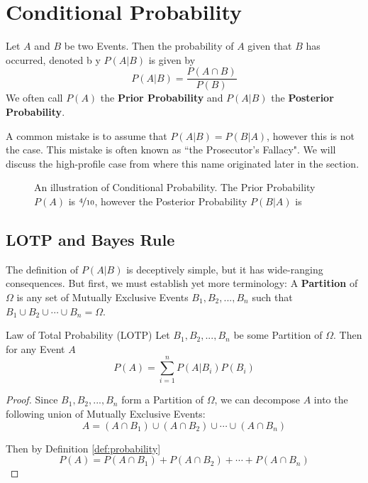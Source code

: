 \documentclass{report}
\begin{document}
\section{Conditional Probability}
Let $A$ and $B$ be two Events. Then the probability of $A$ given that $B$ has occurred, denoted b y $P(A\vert B)$ is given by
\[
    P(A\vert B)=\frac{P(A\cap B)}{P(B)}
\]
We often call $P(A)$ the \textbf{Prior Probability} and $P(A\vert B)$ the \textbf{Posterior Probability}.
\begin{notsofast}
    A common mistake is to assume that $P(A\vert B)=P(B\vert A)$, however this is not the case. This mistake is often known as ``the Prosecutor's Fallacy". We will discuss the high-profile case from where this name originated later in the section.
\end{notsofast}

\begin{figure}
    \centering
    
    \caption{An illustration of Conditional Probability. The Prior Probability $P(A)$ is $\nicefrac 4{10}$, however the Posterior Probability $P(B|A)$ is }
    \label{fig:dependence}
\end{figure}

\subsection{LOTP and Bayes Rule}
The definition of $P(A\vert B)$ is deceptively simple, but it has wide-ranging consequences. But first, we must establish yet more terminology: A \textbf{Partition} of $\Omega$ is any set of Mutually Exclusive Events $B_1,B_2,...,B_n$ such that $B_1\cup B_2\cup\cdots \cup B_n=\Omega$.

\begin{theorem}{Law of Total Probability (LOTP)}
Let $B_1,B_2,...,B_n$ be some Partition of $\Omega$. Then for any Event $A$
\[
    P(A)=\sum_{i=1}^n P(A\vert B_i) P(B_i)
\]
\tcblower
\begin{proof}
    Since $B_1,B_2,...,B_n$ form a Partition of $\Omega$, we can decompose $A$ into the following union of Mutually Exclusive Events:
    \[
        A=(A\cap B_1)\cup (A\cap B_2) \cup \cdots \cup (A\cap B_n)
    \]
    \begin{center}
        
    \end{center}
    Then by Definition \ref{def:probability}
    \[
        P(A)=P(A\cap B_1)+ P(A\cap B_2)+ \cdots + P(A\cap B_n)
    \]
\end{proof}
\end{theorem}
\end{document}

